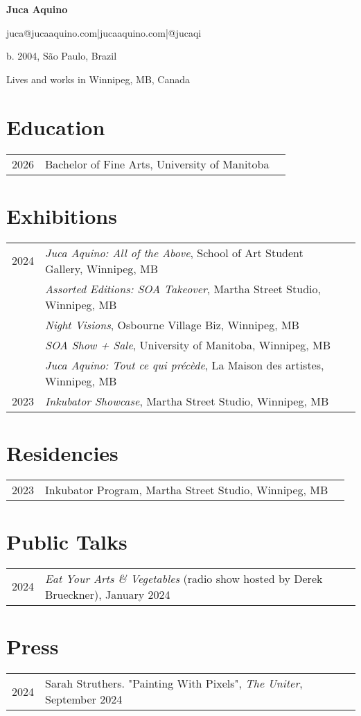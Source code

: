 \documentclass[12pt]{article}
\begin{document}
\begin{flushleft}

{\huge\bfseries Juca Aquino}

juca@jucaaquino.com\quad |\quad jucaaquino.com\quad |\quad @jucaqi

b. 2004, São Paulo, Brazil

Lives and works in Winnipeg, MB, Canada
\section{Education}
\begin{tabular}{@{}lll}
2026 & Bachelor of Fine Arts, University of Manitoba 
\end{tabular}
\section{Exhibitions}
\begin{tabular}{@{}lll}
    2024 & {\itshape Juca Aquino: All of the Above}, School of Art Student Gallery, Winnipeg, MB \\
     & {\itshape Assorted Editions: SOA Takeover}, Martha Street Studio, Winnipeg, MB \\
     & {\itshape Night Visions}, Osbourne Village Biz, Winnipeg, MB \\
     & {\itshape SOA Show + Sale}, University of Manitoba, Winnipeg, MB \\
     & {\itshape Juca Aquino: Tout ce qui précède}, La Maison des artistes, Winnipeg, MB \\
2023 & {\itshape Inkubator Showcase}, Martha Street Studio, Winnipeg, MB
\end{tabular}
\section{Residencies}
\begin{tabular}{@{}lll}
2023 & Inkubator Program, Martha Street Studio, Winnipeg, MB
\end{tabular}
\section{Public Talks}
\begin{tabular}{@{}lll}
    2024 & {\itshape Eat Your Arts \& Vegetables} (radio show hosted by Derek Brueckner), January 2024
\end{tabular}
\section{Press}
\begin{tabular}{@{}lll}
2024 & Sarah Struthers. "Painting With Pixels", {\itshape The Uniter}, September 2024
\end{tabular}

\end{flushleft}
\end{document}
